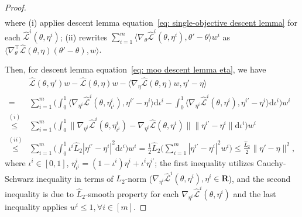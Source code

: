 \documentclass[10pt,a4paper]{amsart}
\def\eqref#1{equation~\ref{#1}}
\newcommand{\fL}{\mathcal{L}}
\newcommand{\fhL}{\hat{\mathcal{L}}}
\newcommand{\hL}{\hat{L}}
\begin{document}
\begin{proof}
\begin{align}
\end{align}
where (i) applies descent lemma \eqref{eq: single-objective descent lemma} for each $\fhL^i({\theta}, \eta^i)$; (ii) rewrites $\sum_{i=1}^{m}\langle\nabla_{{\theta}} {\fhL}^i({\theta}, \eta^i), {\theta}'-{\theta}\rangle w^i$ as $\langle \nabla_{\theta}^{\top}\fhL(\theta, \eta)(\theta'-\theta),w\rangle$. 

Then, for descent lemma \eqref{eq: moo descent lemma eta}, we have
    \begin{align}
         &\fhL(\theta,\eta')w-\fhL(\theta, \eta)w-\langle \nabla_{\eta}\fhL(\theta,\eta)w, \eta'-\eta \rangle \nonumber \\ 
        =& \sum_{i=1}^{m}\Big(\int_{0}^{1}\langle \nabla_{\eta^i} \fhL^i(\theta, \eta^i_{{\iota^i}}), {\eta^{i'}}-\eta^i\rangle \mathrm{d} {\iota}^i - \int_{0}^{1} \langle \nabla_{\eta^i} \fhL^i(\theta, \eta^i), \eta^{i'}-\eta^i\rangle \mathrm{d}{\iota}^i\Big)w^i  \nonumber \\
        \overset{(i)}{\leq}& \sum_{i=1}^{m}
        \Big(\int_{0}^{1}  \|\nabla_{\eta^i} \fhL^i(\theta, \eta^i_{\iota^i})-\nabla_{\eta^i} \fhL(\theta,\eta^i ) \| \|\eta^{i'}-\eta^i \|\mathrm{d}\iota^i \Big) w^i\nonumber \\
        \overset{(ii)}{\leq}& \sum_{i=1}^{m} \Big(\int_{0}^{1} \iota^i \hL_2|\eta^{i'}-\eta^i|^2 \mathrm{d}\iota^i \Big) w^i=\frac{1}{2}\hL_2\Big(\sum_{i=1}^{m}|\eta^{i'}-\eta^i|^2w^i\Big) \leq \frac{\hL_2}{2}\|\eta'-\eta\|^2,\nonumber
    \end{align}
    where $\iota^i\in[0,1]$, $\eta^i_{\iota^i}=(1-\iota^i)\eta^i+\iota^i\eta^{i'}$; the first inequality utilizes Cauchy-Schwarz inequality in terms of $L_2$-norm ($\nabla_{\eta^i}\fhL^i(\theta, \eta^i), \eta^i\in\mathbf{R}$), and the second inequality is due to $\hL_2$-smooth property for each $\nabla_{\eta^i}\fhL^i(\theta, \eta^i)$ and the last inequality applies $w^i\leq 1,\forall i\in[m]$.
\end{proof}
\end{document}
